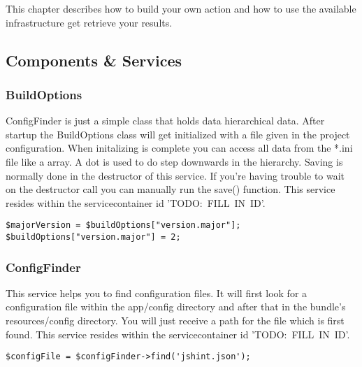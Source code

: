 This chapter describes how to build your own action and how to use the available infrastructure get retrieve your results.

\subsection{Components \& Services}

\subsubsection{BuildOptions}
ConfigFinder is just a simple class that holds data hierarchical data. After startup the BuildOptions class will get initialized with a file given in the project configuration. When initalizing is complete you can access all data from the *.ini file like a array. A dot is used to do step downwards in the hierarchy. Saving is normally done in the destructor of this service. If you're having trouble to wait on the destructor call you can manually run the save() function. This service resides within the servicecontainer id \mbox{'TODO: FILL IN ID'}.

\begin{verbatim}
$majorVersion = $buildOptions["version.major"];
$buildOptions["version.major"] = 2;
\end{verbatim}

\subsubsection{ConfigFinder}
This service helps you to find configuration files. It will first look for a configuration file within the app/config directory and after that in the bundle's resources/config directory. You will just receive a path for the file which is first found. This service resides within the servicecontainer id \mbox{'TODO: FILL IN ID'}.

\begin{verbatim}
$configFile = $configFinder->find('jshint.json');
\end{verbatim}

